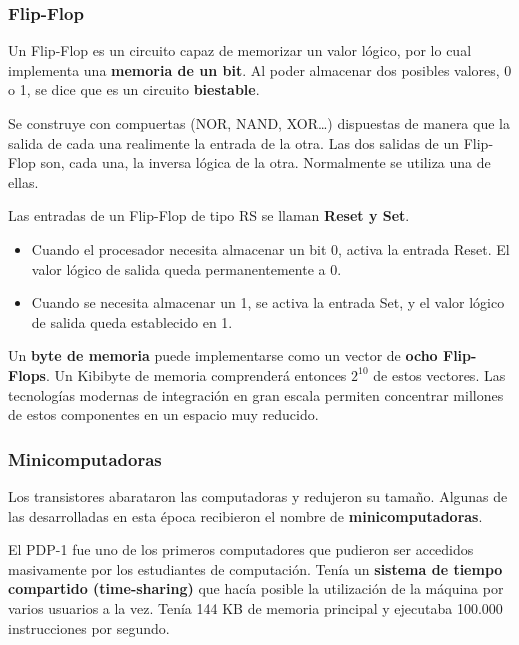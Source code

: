 \documentclass[spanish,A4,]{article}
\begin{document}
\subsubsection{Flip-Flop}\label{flip-flop}

Un Flip-Flop es un circuito capaz de memorizar un valor lógico, por lo
cual implementa una \textbf{memoria de un bit}. Al poder almacenar dos
posibles valores, 0 o 1, se dice que es un circuito \textbf{biestable}.

Se construye con compuertas (NOR, NAND, XOR\ldots{}) dispuestas de
manera que la salida de cada una realimente la entrada de la otra. Las
dos salidas de un Flip-Flop son, cada una, la inversa lógica de la otra.
Normalmente se utiliza una de ellas.

Las entradas de un Flip-Flop de tipo RS se llaman \textbf{Reset y Set}.

\begin{itemize}
\itemsep1pt\parskip0pt
\item
  Cuando el procesador necesita almacenar un bit 0, activa la entrada
  Reset. El valor lógico de salida queda permanentemente a 0.
\item
  Cuando se necesita almacenar un 1, se activa la entrada Set, y el
  valor lógico de salida queda establecido en 1.
\end{itemize}

Un \textbf{byte de memoria} puede implementarse como un vector de
\textbf{ocho Flip-Flops}. Un Kibibyte de memoria comprenderá entonces
$2^{10}$ de estos vectores. Las tecnologías modernas de integración en
gran escala permiten concentrar millones de estos componentes en un
espacio muy reducido.

\subsubsection{Minicomputadoras}\label{minicomputadoras}

Los transistores abarataron las computadoras y redujeron su tamaño.
Algunas de las desarrolladas en esta época recibieron el nombre de
\textbf{minicomputadoras}.

El PDP-1 fue uno de los primeros computadores que pudieron ser accedidos
masivamente por los estudiantes de computación. Tenía un \textbf{sistema
de tiempo compartido (time-sharing)} que hacía posible la utilización de
la máquina por varios usuarios a la vez. Tenía 144 KB de memoria
principal y ejecutaba 100.000 instrucciones por segundo.
\end{document}
